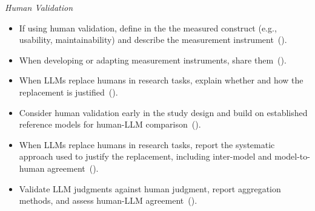 \noindent\textit{Human Validation}
\begin{itemize}[label={},leftmargin=*]
    \item \iconM {} If using human validation, define in the \paper the measured construct (e.g., usability, maintainability) and describe the measurement instrument~().
    \item \iconM {} When developing or adapting measurement instruments, share them~().
    \item \iconM {} When LLMs replace humans in research tasks, explain whether and how the replacement is justified~().
    \item \iconS Consider human validation early in the study design and build on established reference models for human-LLM comparison~().
    \item \iconS {} When LLMs replace humans in research tasks, report the systematic approach used to justify the replacement, including inter-model and model-to-human agreement~().
    \item \iconS {} Validate LLM judgments against human judgment, report aggregation methods, and assess human-LLM agreement~().

\end{itemize}
